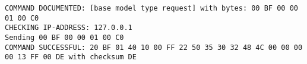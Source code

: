 
\begin{lstlisting}[caption={Ausgabe des implementierten Python-Skripts \textit{binaryProt.py}.
                            Es gibt den gesendeten Befehl in hexadezimaler Schreibweise,
                            sowie die \gls{ip}-Adresse des Geräts und die vom
                            Gerät gesendete Antwort aus.},label={lst:binary-prot-py-ausgabe}]
COMMAND DOCUMENTED: [base model type request] with bytes: 00 BF 00 00 01 00 C0
CHECKING IP-ADDRESS: 127.0.0.1
Sending 00 BF 00 00 01 00 C0
COMMAND SUCCESSFUL: 20 BF 01 40 10 00 FF 22 50 35 30 32 48 4C 00 00 00 00 13 FF 00 DE with checksum DE
\end{lstlisting}